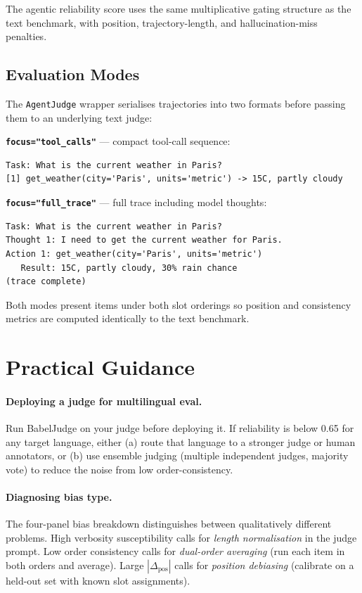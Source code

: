 \documentclass[11pt]{article}
\begin{document}
The agentic reliability score uses the same multiplicative gating structure as the text benchmark, with position, trajectory-length, and hallucination-miss penalties.

\subsection{Evaluation Modes}

The \texttt{AgentJudge} wrapper serialises trajectories into two formats before passing them to an underlying text judge:

\textbf{\texttt{focus="tool\_calls"}} — compact tool-call sequence:
\begin{lstlisting}
Task: What is the current weather in Paris?
[1] get_weather(city='Paris', units='metric') -> 15C, partly cloudy
\end{lstlisting}

\textbf{\texttt{focus="full\_trace"}} — full trace including model thoughts:
\begin{lstlisting}
Task: What is the current weather in Paris?
Thought 1: I need to get the current weather for Paris.
Action 1: get_weather(city='Paris', units='metric')
   Result: 15C, partly cloudy, 30% rain chance
(trace complete)
\end{lstlisting}

Both modes present items under both slot orderings so position and consistency metrics are computed identically to the text benchmark.

\section{Practical Guidance}
\label{sec:guidance}

\paragraph{Deploying a judge for multilingual eval.}
Run BabelJudge on your judge before deploying it. If reliability is below 0.65 for any target language, either (a) route that language to a stronger judge or human annotators, or (b) use ensemble judging (multiple independent judges, majority vote) to reduce the noise from low order-consistency.

\paragraph{Diagnosing bias type.}
The four-panel bias breakdown distinguishes between qualitatively different problems. High verbosity susceptibility calls for \emph{length normalisation} in the judge prompt. Low order consistency calls for \emph{dual-order averaging} (run each item in both orders and average). Large $|\Delta_{\text{pos}}|$ calls for \emph{position debiasing} (calibrate on a held-out set with known slot assignments).
\end{document}

